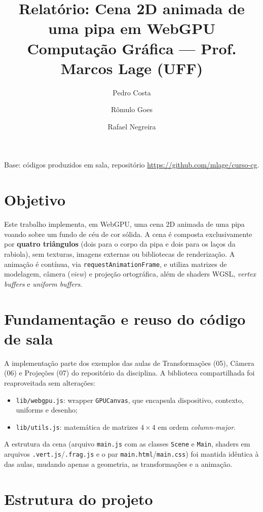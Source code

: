 \documentclass[11pt,a4paper]{article}
\title{Relatório: Cena 2D animada de uma pipa em WebGPU\\
\small Computação Gráfica --- Prof. Marcos Lage (UFF)}
\author{Pedro Costa \and Rômulo Goes \and Rafael Negreira}
\date{}
\newcommand{\code}[1]{\texttt{#1}}
\begin{document}
\maketitle

\noindent Base: códigos produzidos em sala, repositório
\url{https://github.com/mlage/curso-cg}.

\section{Objetivo}

Este trabalho implementa, em WebGPU, uma cena 2D animada de uma pipa voando
sobre um fundo de céu de cor sólida. A cena é composta exclusivamente por
\textbf{quatro triângulos} (dois para o corpo da pipa e dois para os laços da
rabiola), sem texturas, imagens externas ou bibliotecas de renderização. A
animação é contínua, via \code{requestAnimationFrame}, e utiliza matrizes de
modelagem, câmera (\emph{view}) e projeção ortográfica, além de shaders WGSL,
\emph{vertex buffers} e \emph{uniform buffers}.

\section{Fundamentação e reuso do código de sala}

A implementação parte dos exemplos das aulas de Transformações (05), Câmera
(06) e Projeções (07) do repositório da disciplina. A biblioteca compartilhada
foi reaproveitada sem alterações:

\begin{itemize}
    \item \code{lib/webgpu.js}: wrapper \code{GPUCanvas}, que encapsula
          dispositivo, contexto, uniforms e desenho;
    \item \code{lib/utils.js}: matemática de matrizes $4\times4$ em ordem
          \emph{column-major}.
\end{itemize}

A estrutura da cena (arquivo \code{main.js} com as classes \code{Scene} e
\code{Main}, shaders em arquivos \code{.vert.js}/\code{.frag.js} e o par
\code{main.html}/\code{main.css}) foi mantida idêntica à das aulas, mudando
apenas a geometria, as transformações e a animação.

\section{Estrutura do projeto}
\end{document}
